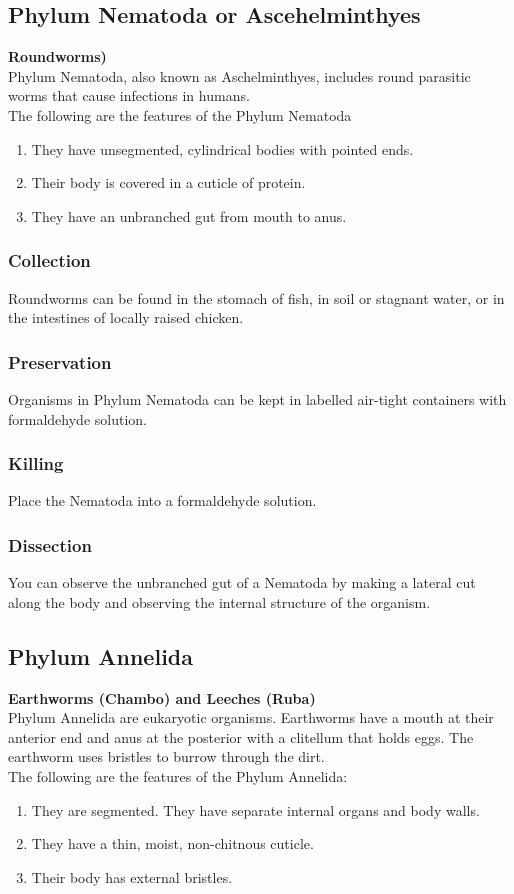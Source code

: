 \subsection{Phylum Nematoda or Ascehelminthyes}
\textbf{Roundworms)}\\
Phylum Nematoda, also known as Aschelminthyes, includes round parasitic worms that cause infections in humans.\\
The following are the features of the Phylum Nematoda 
\begin{enumerate}
\item{They have unsegmented, cylindrical bodies with pointed ends.}
\item{Their body is covered in a cuticle of protein.}
\item{They have an unbranched gut from mouth to anus.}
\end{enumerate}

\subsubsection{Collection}
Roundworms can be found in the stomach of fish, in soil or stagnant water, or in the intestines of locally raised chicken.

\subsubsection{Preservation} 
Organisms in Phylum Nematoda can be kept in labelled air-tight containers with formaldehyde solution.

\subsubsection{Killing}
Place the Nematoda into a formaldehyde solution.

\subsubsection{Dissection}
You can observe the unbranched gut of a Nematoda by making a lateral cut along the body and observing the internal structure of the organism.

\subsection{Phylum Annelida}
\textbf{Earthworms (Chambo) and Leeches (Ruba)}\\ 
Phylum Annelida are eukaryotic organisms. Earthworms have a mouth at their anterior end and anus at the posterior with a clitellum that holds eggs. The earthworm uses bristles to burrow through the dirt. \\
The following are the features of the Phylum Annelida:
\begin{enumerate}
\item{They are segmented. They have separate internal organs and body walls.}
\item{They have a thin, moist, non-chitnous cuticle.}
\item{Their body has external bristles.}
\end{enumerate}

